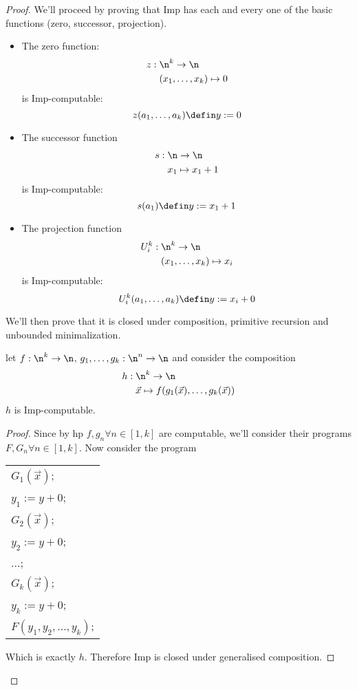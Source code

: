 \begin{proof}

  We'll proceed by proving that Imp has each and every one of the
  basic functions (zero, successor, projection). 

  \begin{itemize}
  \item The zero function:
    \begin{align*}
      z : \; & \n^k \to \n \\
      & (x_1, \dots, x_k) \mapsto 0
    \end{align*}
    is Imp-computable: \[z(a_1,\dots,a_k) \defin y := 0\]
  \item The successor function
    \begin{align*}
      s : \; & \n \to \n \\
      & x_1 \mapsto x_1 + 1
    \end{align*}
    is Imp-computable: \[s(a_1) \defin y := x_1 + 1\]
  \item The projection function
    \begin{align*}
      U_i^k : \; & \n^k \to \n \\
      & (x_1,\dots,x_k) \mapsto x_i
    \end{align*}
    is Imp-computable: \[U_i^k(a_1, \dots, a_k) \defin y := x_i + 0\]
  \end{itemize}

  We'll then prove that it is closed under composition, primitive
  recursion and unbounded minimalization.

  \begin{lemma}
    let \(f : \n^k \to \n\), \(g_1,\dots,g_k : \n^n \to \n\) and
    consider the composition
    \begin{align*}
      h : \; & \n^k \to \n \\
      & \vec{x} \mapsto f(g_1(\vec{x}), \dots, g_k(\vec{x}))
    \end{align*}
    \(h\) is Imp-computable.
  \end{lemma}
  \begin{proof}
    Since by hp \(f, g_n \forall n\in [1,k]\)
    are computable, we'll consider their programs \(F, G_n\forall n
    \in [1,k]\). Now consider the program
    \begin{center}
      \begin{tabular}{l}
        \(G_1(\vec{x})\);\\[0pt]
        \(y_1 := y + 0\);\\[0pt]
        \(G_2(\vec{x})\);\\[0pt]
        \(y_2 := y + 0\);\\[0pt]
        \(\dots\);\\[0pt]
        \(G_k(\vec{x})\);\\[0pt]
        \(y_k := y + 0\);\\[0pt]
        \(F(y_1, y_2,\dots, y_k)\);\\[0pt]
      \end{tabular}
    \end{center}
    Which is exactly \(h\). Therefore Imp is closed under generalised
    composition.
  \end{proof}


\end{proof}
